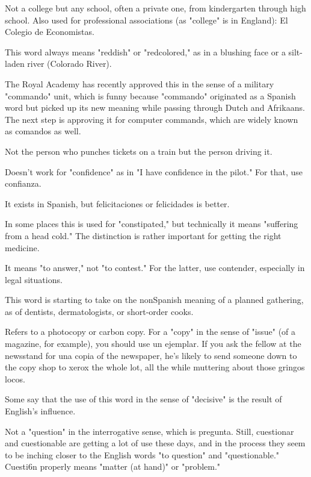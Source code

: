  Not a college but any school, often a private one,
from kindergarten through high school. Also used for professional associations (as "college" is in England): El Colegio de Economistas.

 This word always means "reddish" or "redcolored," as in a blushing face or a silt-laden river (Colorado River).

 The Royal Academy has recently approved this in
the sense of a military "commando" unit, which is funny because "commando" originated as a Spanish word but picked up its new meaning
while passing through Dutch and Afrikaans. The next step is approving it for computer commands, which are widely known as comandos
as well.

 Not the person who punches tickets on a train
but the person driving it.

 Doesn't work for "confidence" as in "I have
confidence in the pilot." For that, use confianza.

 It exists in Spanish, but felicitaciones
or felicidades is better.

 In some places this is used for "constipated,"
but technically it means "suffering from a head cold." The distinction
is rather important for getting the right medicine.

 It means "to answer," not "to contest." For the
latter, use contender, especially in legal situations.

 This word is starting to take on the nonSpanish meaning of a planned gathering, as of dentists, dermatologists, or short-order cooks.

 Refers to a photocopy or carbon copy. For a "copy" in
the sense of "issue" (of a magazine, for example), you should use un
ejemplar. If you ask the fellow at the newsstand for una copia of the
newspaper, he's likely to send someone down to the copy shop to
xerox the whole lot, all the while muttering about those gringos
locos.

 Some say that the use of this word in the sense of
"decisive" is the result of English's influence.

 Not a "question" in the interrogative sense,
which is pregunta. Still, cuestionar and cuestionable are getting a
lot of use these days, and in the process they seem to be inching closer
to the English words "to question" and "questionable." Cuesti6n properly means "matter (at hand)" or "problem."

